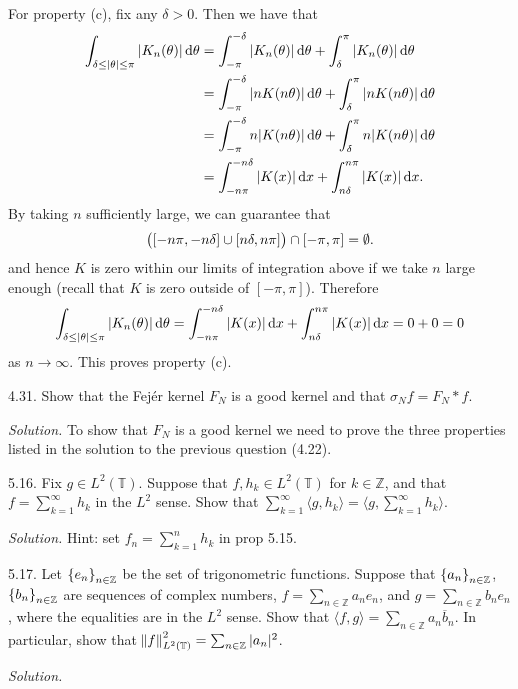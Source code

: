 \documentclass{article}
\newcommand{\T}{\mathbb{T}}
\newcommand{\Z}{\mathbb{Z}}
\begin{document}
For property (c), fix any $\delta > 0$. Then we have that
%
\begin{align*}
    \int_{\delta \leq |\theta| \leq \pi} |K_n(\theta)| \dif \theta
        &=
        \int_{- \pi}^{-\delta} |K_n(\theta)| \dif \theta
        +
        \int_{\delta}^{\pi} |K_n(\theta)| \dif \theta
        \\
        &=
        \int_{- \pi}^{-\delta} |n K(n \theta)| \dif \theta
        +
        \int_{\delta}^{\pi} |n K(n \theta)| \dif \theta
        \\
        &=
        \int_{- \pi}^{-\delta} n |K(n \theta)| \dif \theta
        +
        \int_{\delta}^{\pi} n |K(n \theta)| \dif \theta
        \\
        &=
        \int_{- n \pi}^{-n \delta} |K(x)| \dif x
        +
        \int_{n \delta}^{n \pi} |K(x)| \dif x
    .
\end{align*}
%
By taking $n$ sufficiently large, we can guarantee that
%
\begin{equation*}
    \del{[- n \pi, - n \delta] \cup [n \delta, n \pi]} \cap [- \pi, \pi] = \emptyset
    .
\end{equation*}
%
and hence $K$ is zero within our limits of integration above if we take
$n$ large enough (recall that $K$ is zero outside of $[- \pi, \pi]$). Therefore
%
\begin{equation*}
    \int_{\delta \leq |\theta| \leq \pi} |K_n(\theta)| \dif \theta
        =
        \int_{- n \pi}^{-n \delta} |K(x)| \dif x
        +
        \int_{n \delta}^{n \pi} |K(x)| \dif x
        = 0 + 0 = 0
\end{equation*}
%
as $n \to \infty$. This proves property (c).

\newpage

4.31. Show that the Fejér kernel $F_N$ is a good kernel and that
$\sigma_N f = F_N * f$.

\textit{Solution.}
To show that $F_N$ is a good kernel we need to prove the three
properties listed in the solution to the previous question (4.22).

\newpage

5.16. Fix $g \in L^2(\T)$. Suppose that $f, h_k \in L^2(\T)$ for $k \in \Z$,
and that $f = \sum_{k = 1}^\infty h_k$ in the $L^2$ sense. Show that
$\sum_{k = 1}^\infty \langle g, h_k \rangle = \langle g, \sum_{k = 1}^\infty h_k \rangle$.

\textit{Solution.}
Hint: set $f_n = \sum_{k = 1}^n h_k$ in prop 5.15.

\newpage

5.17. Let $\cbr{e_n}_{n \in \Z}$ be the set of trigonometric functions.
Suppose that $\cbr{a_n}_{n \in \Z}$, $\cbr{b_n}_{n \in \Z}$ are sequences
of complex numbers, $f = \sum_{n \in \Z} a_n e_n$, and
$g = \sum_{n \in \Z} b_n e_n$, where the equalities are in the $L^2$ sense.
Show that $\langle f, g \rangle = \sum_{n \in \Z} a_n \overline{b}_n$.
In particular, show that $\norm{f}^2_{L^2(\T)} = \sum_{n \in \Z} |a_n|^2$.

\textit{Solution.}
\end{document}
